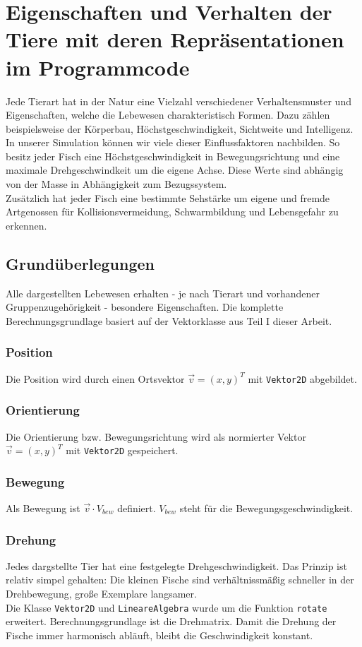 \documentclass[11pt]{article}
\begin{document}
\section{Eigenschaften und Verhalten der Tiere mit deren Repräsentationen im Programmcode}
Jede Tierart hat in der Natur eine Vielzahl verschiedener Verhaltensmuster und Eigenschaften, welche die Lebewesen charakteristisch Formen. Dazu zählen beispielsweise der Körperbau, Höchstgeschwindigkeit, Sichtweite und Intelligenz. In unserer Simulation können wir viele dieser Einflussfaktoren nachbilden.
So besitz jeder Fisch eine Höchstgeschwindigkeit in Bewegungsrichtung und eine maximale Drehgeschwindkeit um die eigene Achse. Diese Werte sind abhängig von der Masse in Abhängigkeit zum Bezugssystem.\\
Zusätzlich hat jeder Fisch eine bestimmte Sehstärke um eigene und fremde Artgenossen für Kollisionsvermeidung, Schwarmbildung und Lebensgefahr zu erkennen.
\newpage
\subsection{Grundüberlegungen}
Alle dargestellten Lebewesen erhalten - je nach Tierart und vorhandener Gruppenzugehörigkeit - besondere Eigenschaften. Die komplette Berechnungsgrundlage basiert auf der Vektorklasse aus Teil I dieser Arbeit.
\subsubsection{Position}
Die Position wird durch einen Ortsvektor \( \vec{v}=(x,y)^T \) mit \lstinline{Vektor2D} abgebildet.
\subsubsection{Orientierung}
Die Orientierung bzw. Bewegungsrichtung wird als normierter Vektor \( \vec{v}=(x,y)^T \) mit \lstinline{Vektor2D} gespeichert.
\subsubsection{Bewegung}
Als Bewegung ist \( \vec{v} \cdot V_{bew} \) definiert. \( V_{bew} \) steht für die Bewegungsgeschwindigkeit.
\subsubsection{Drehung}
Jedes dargstellte Tier hat eine festgelegte Drehgeschwindigkeit. Das Prinzip ist relativ simpel gehalten: Die kleinen Fische sind verhältnissmäßig schneller in der Drehbewegung, große Exemplare langsamer.\\
Die Klasse \lstinline{Vektor2D} und \lstinline{LineareAlgebra} wurde um die Funktion \lstinline{rotate} erweitert. Berechnungsgrundlage ist die Drehmatrix. Damit die Drehung der Fische immer harmonisch abläuft, bleibt die Geschwindigkeit konstant.
\end{document}
